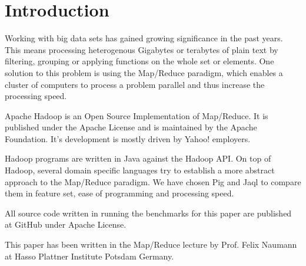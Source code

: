 \section{Introduction}

Working with big data sets has gained growing significance in the past years. This means processing heterogenous Gigabytes or terabytes of plain text by filtering, grouping or applying functions on the whole set or elements. One solution to this problem is using the Map/Reduce paradigm, which enables a cluster of computers to process a problem parallel and thus increase the processing speed.

Apache Hadoop is an Open Source Implementation of Map/Reduce. It is published under the Apache License and is maintained by the Apache Foundation. It's development is mostly driven by Yahoo! employers.

Hadoop programs are written in Java against the Hadoop API. On top of Hadoop, several domain specific languages try to establish a more abstract approach to the Map/Reduce paradigm. We have chosen Pig and Jaql to compare them in feature set, ease of programming and processing speed.

All source code written in running the benchmarks for this paper are published at GitHub under Apache License.

This paper has been written in the Map/Reduce lecture by Prof. Felix Naumann at Hasso Plattner Institute Potsdam Germany.